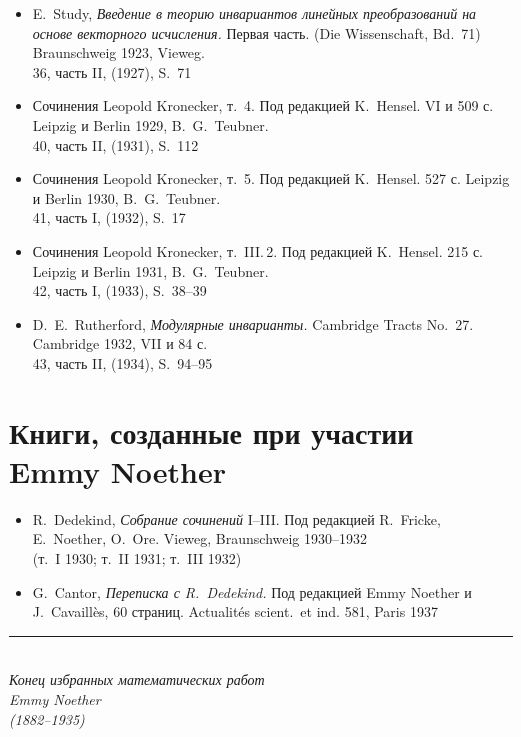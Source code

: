 \documentclass[11pt]{article}
\newcommand{\foreign}[1]{#1}
\begin{document}
\begin{itemize}[leftmargin=1.5em,itemsep=0.2em]
\item E.\ Study, \textit{Введение в теорию инвариантов линейных преобразований на основе векторного исчисления.} Первая часть. (\foreign{Die Wissenschaft}, Bd.~71) Braunschweig 1923, Vieweg.\\
36, часть II, (1927), S.~71

\item Сочинения Leopold Kronecker, т.~4. Под редакцией K.\ Hensel. VI и 509 с. Leipzig и Berlin 1929, B.\ G.\ Teubner.\\
40, часть II, (1931), S.~112

\item Сочинения Leopold Kronecker, т.~5. Под редакцией K.\ Hensel. 527 с. Leipzig и Berlin 1930, B.\ G.\ Teubner.\\
41, часть I, (1932), S.~17

\item Сочинения Leopold Kronecker, т.~III.\,2. Под редакцией K.\ Hensel. 215 с. Leipzig и Berlin 1931, B.\ G.\ Teubner.\\
42, часть I, (1933), S.~38--39

\item D.\ E.\ Rutherford, \textit{Модулярные инварианты.} \foreign{Cambridge Tracts No.~27.} Cambridge 1932, VII и 84 с.\\
43, часть II, (1934), S.~94--95
\end{itemize}

\newpage
\section*{Книги, созданные при участии Emmy Noether}

\begin{itemize}[leftmargin=1.5em,itemsep=0.5em]
\item R.\ Dedekind, \textit{Собрание сочинений} I--III. Под редакцией R.\ Fricke, E.\ Noether, O.\ Ore. Vieweg, Braunschweig 1930--1932\\
(т.~I 1930; т.~II 1931; т.~III 1932)

\item G.\ Cantor, \textit{Переписка с R.\ Dedekind.} Под редакцией Emmy Noether и J.\ Cavaillès, 60 страниц. \foreign{Actualités scient.\ et ind.} 581, Paris 1937
\end{itemize}

\vfill

\begin{center}
\rule{0.5\textwidth}{0.4pt}\\[1em]
\textit{Конец избранных математических работ}\\[0.5em]
\textit{Emmy Noether}\\[0.5em]
\textit{(1882--1935)}
\end{center}
\end{document}
